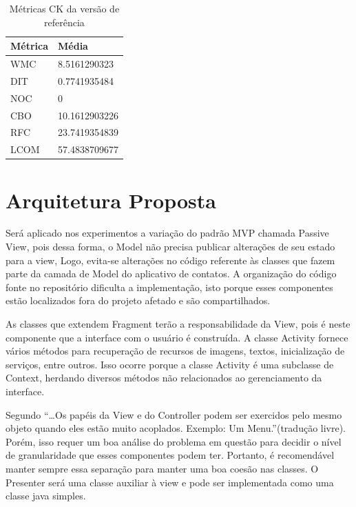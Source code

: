 \begin{table}[h]
	\centering
	    \caption{Métricas CK da versão de referência}
	
    \begin{tabular}{ | l | l | }
    \hline
    Métrica &	Média \\ \hline
    WMC  	&	8.5161290323   	\\ \hline
    DIT	 	&	0.7741935484	\\ \hline
	NOC  	& 	0				\\ \hline
	CBO	  	& 	10.1612903226	\\ \hline
	RFC	 	& 	23.7419354839	\\ \hline
	LCOM 	& 	57.4838709677	\\ \hline
    \end{tabular}
    \label{tab:dados_baseline}
\end{table}


\section{Arquitetura Proposta}

Será aplicado nos experimentos a variação do padrão MVP chamada Passive View,
pois dessa forma, o Model não precisa publicar alterações de seu estado para a
view, Logo, evita-se alterações no código referente às classes que fazem
parte da camada de Model do aplicativo de contatos. A organização do código
fonte no repositório dificulta a implementação, isto porque esses componentes estão
localizados fora do projeto afetado e são compartilhados.

As classes que extendem Fragment terão a responsabilidade da View, pois é neste
componente que a interface com o usuário é construída. A classe Activity fornece
vários métodos para recuperação de recursos de imagens, textos, inicialização de
serviços, entre outros. Isso ocorre porque a classe Activity é uma subclasse de Context, herdando diversos métodos não relacionados ao gerenciamento da interface.

Segundo  ``\ldots Os papéis da View e do
Controller podem ser exercidos pelo mesmo objeto quando eles estão muito
acoplados. Exemplo: Um Menu.''(tradução livre). Porém, isso requer um boa
análise do problema em questão para decidir o nível de granularidade que esses componentes podem ter.
Portanto, é recomendável manter sempre essa separação para manter uma boa coesão
nas classes. O Presenter será uma classe auxiliar à view e pode ser implementada
como uma classe java simples. 



